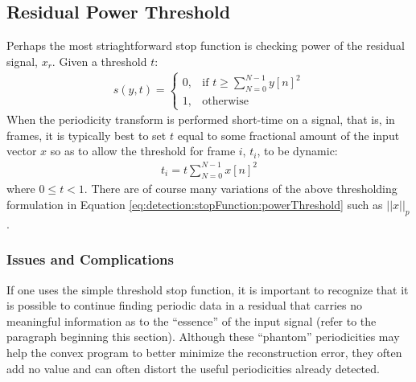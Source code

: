     \subsection{Residual Power Threshold}
    Perhaps the most striaghtforward stop function is checking power of the residual signal, $x_r$. Given a threshold $t$:
    \begin{align}\label{eq:detection:stopFunction:powerThreshold}
        s(y, t) =
            \begin{cases}
                0, & \text{if } t \geq \sum_{N = 0}^{N-1} y[n]^2 \\
                1, & \text{otherwise}
            \end{cases}
    \end{align}
    When the periodicity transform is performed short-time on a signal, that is, in frames, it is typically best to set $t$ equal to some fractional amount of the input vector $x$ so as to allow the threshold for frame $i$, $t_i$, to be dynamic:
    \begin{align*}
        t_i = t \sum_{N = 0}^{N-1} x[n]^2
    \end{align*}
    where $0 \leq t < 1$. There are of course many variations of the above thresholding formulation in Equation \eqref{eq:detection:stopFunction:powerThreshold} such as $||x||_p$.

        \subsubsection{Issues and Complications}
        If one uses the simple threshold stop function, it is important to recognize that it is possible to continue finding periodic data in a residual that carries no meaningful information as to the ``essence'' of the input signal (refer to the paragraph beginning this section). Although these ``phantom'' periodicities may help the convex program to better minimize the reconstruction error, they often add no value and can often distort the useful periodicities already detected.

